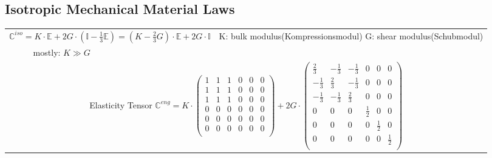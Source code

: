 \subsection{Isotropic Mechanical Material Laws}
	\begin{tabularx}{\columnwidth}{p{3cm}XX}
		\hline 
		 \multicolumn{2}{p{10cm}}{$\mathbb{C}^{iso} = K \cdot \mathbb{E} + 2G \cdot (\mathbb{I} - \frac{1}{3}
		 \mathbb{E}) =  (K - \frac{2}{3} G) \cdot \mathbb{E} + 2G \cdot \mathbb{I}$ } &
		 K: bulk modulus(Kompressionsmodul) \newline G: shear modulus(Schubmodul)\\
		 &mostly: $K \gg G$ &\\
		 \hline 
		 \multicolumn{3}{c}{Elasticity Tensor 
		 	$\mathbb{C}^{eng} = K \cdot \begin{pmatrix}
		 		1 & 1 & 1 & 0 & 0 & 0\\
		 		1 & 1 & 1 & 0 & 0 & 0\\
		 		1 & 1 & 1 & 0 & 0 & 0\\
		 		0 & 0 & 0 & 0 & 0 & 0\\
		 		0 & 0 & 0 & 0 & 0 & 0\\
		 		0 & 0 & 0 & 0 & 0 & 0\\
		 	\end{pmatrix}
		 	+ 2 G \cdot \begin{pmatrix}
		 		\frac{2}{3} & -\frac{1}{3} & -\frac{1}{3} & 0 & 0 & 0\\
		 		-\frac{1}{3} & \frac{2}{3} & -\frac{1}{3} & 0 & 0 & 0\\
		 		-\frac{1}{3} & -\frac{1}{3} & \frac{2}{3} & 0 & 0 & 0\\
		 		0 & 0 & 0 & \frac{1}{2} & 0 & 0\\
		 		0 & 0 & 0 & 0 & \frac{1}{2} & 0\\
		 		0 & 0 & 0 & 0 & 0 & \frac{1}{2}\\
		 	\end{pmatrix}$}\\
		 \hline 
		 

\end{tabularx}
